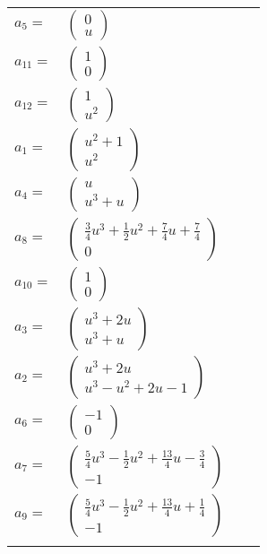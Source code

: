 \documentclass[1p]{elsarticle_modified}
\theoremstyle{definition}
\begin{document}
\begin{tabular}{m{7pt} m{180pt} m{7pt} m{180pt} }
\flushright $a_{5}=$&$\begin{pmatrix}0\\u\end{pmatrix}$ \\
\flushright $a_{11}=$&$\begin{pmatrix}1\\0\end{pmatrix}$ \\
\flushright $a_{12}=$&$\begin{pmatrix}1\\u^2\end{pmatrix}$ \\
\flushright $a_{1}=$&$\begin{pmatrix}u^2+1\\u^2\end{pmatrix}$ \\
\flushright $a_{4}=$&$\begin{pmatrix}u\\u^3+u\end{pmatrix}$ \\
\flushright $a_{8}=$&$\begin{pmatrix}\frac{3}{4} u^3+\frac{1}{2} u^2+\frac{7}{4} u+\frac{7}{4}\\0\end{pmatrix}$ \\
\flushright $a_{10}=$&$\begin{pmatrix}1\\0\end{pmatrix}$ \\
\flushright $a_{3}=$&$\begin{pmatrix}u^3+2 u\\u^3+u\end{pmatrix}$ \\
\flushright $a_{2}=$&$\begin{pmatrix}u^3+2 u\\u^3- u^2+2 u-1\end{pmatrix}$ \\
\flushright $a_{6}=$&$\begin{pmatrix}-1\\0\end{pmatrix}$ \\
\flushright $a_{7}=$&$\begin{pmatrix}\frac{5}{4} u^3-\frac{1}{2} u^2+\frac{13}{4} u-\frac{3}{4}\\-1\end{pmatrix}$ \\
\flushright $a_{9}=$&$\begin{pmatrix}\frac{5}{4} u^3-\frac{1}{2} u^2+\frac{13}{4} u+\frac{1}{4}\\-1\end{pmatrix}$\\&\end{tabular}
\end{document}
